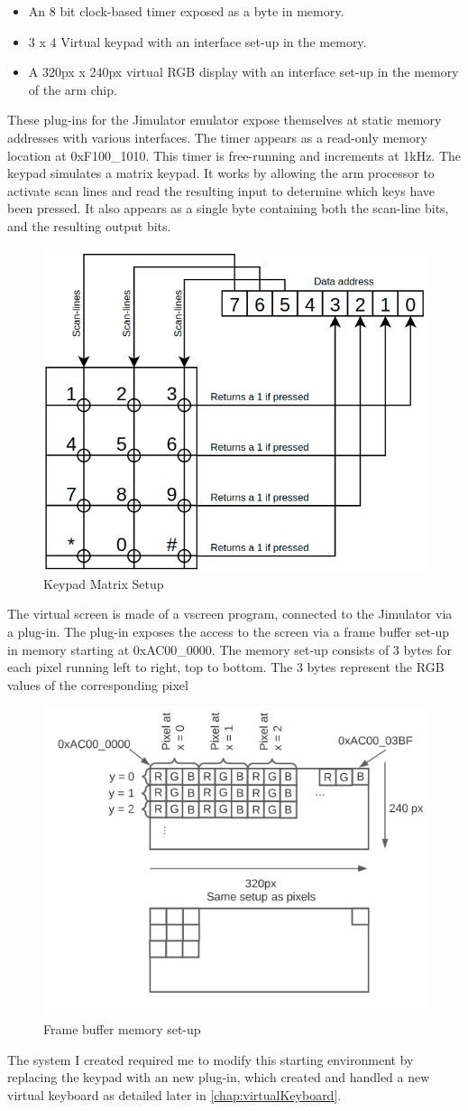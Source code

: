 \begin{itemize}
	\item An 8 bit clock-based timer exposed as a byte in memory.
	\item 3 x 4 Virtual keypad with an interface set-up in the memory.
	\item A 320px x 240px virtual RGB display with an interface set-up in the memory of the arm chip.
\end{itemize}

These plug-ins for the Jimulator emulator expose themselves at static memory addresses with various interfaces.
The timer appears as a read-only memory location at 0xF100\_1010. This timer is free-running and increments at 1kHz. 
The keypad simulates a matrix keypad. It works by allowing the arm processor to activate scan lines and read the resulting input to determine which keys have been pressed. It also appears as a single byte containing both the scan-line bits, and the resulting output bits.

\begin{figure}[ht!]
	\includegraphics[width=0.5\linewidth]{figures/keypad.png}\centering
	\caption{Keypad Matrix Setup}
	\label{fig:keypad}
\end{figure}

The virtual screen is made of a vscreen program, connected to the Jimulator via a plug-in. The plug-in exposes the access to the screen via a frame buffer set-up in memory starting at 0xAC00\_0000. The memory set-up consists of 3 bytes for each pixel running left to right, top to bottom. The 3 bytes represent the RGB values of the corresponding pixel

\begin{figure}[ht!]
	\includegraphics[width=0.5\linewidth]{figures/LCD.png}\centering
	\caption{Frame buffer memory set-up}
	\label{fig:LCDMem}
\end{figure}

The system I created required me to modify this starting environment by replacing the keypad with an new plug-in, which created and handled a new virtual keyboard as detailed later in \autoref{chap:virtualKeyboard}. 
